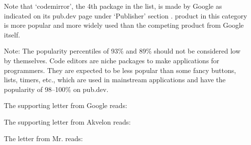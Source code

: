 Note that `codemirror', the 4th package in the list, is made by Google
as indicated on its pub.dev page under `Publisher' section .
\mrls product in this category is more popular and more widely used than the competing product from Google itself.

Note: The popularity percentiles of 93\% and 89\% should not be considered low by themselves.
Code editors are niche packages to make applications for programmers.
They are expected to be less popular than some fancy buttons, lists, timers, etc.,
which are used in mainstream applications and have the popularity of 98--100\% on pub.dev.



The supporting letter from Google reads:


The supporting letter from Akvelon reads:


The letter from Mr. \MrEditorT reads:

